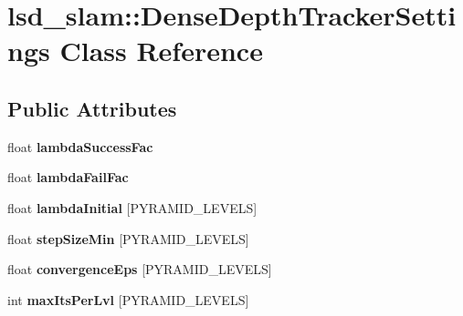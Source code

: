 \hypertarget{classlsd__slam_1_1_dense_depth_tracker_settings}{\section{lsd\-\_\-slam\-:\-:Dense\-Depth\-Tracker\-Settings Class Reference}
\label{classlsd__slam_1_1_dense_depth_tracker_settings}
}
\subsection*{Public Attributes}
\begin{DoxyCompactItemize}
\item 
\hypertarget{classlsd__slam_1_1_dense_depth_tracker_settings_ac964eeef2837d1047245598866f3fd31}{float {\bfseries lambda\-Success\-Fac}}\label{classlsd__slam_1_1_dense_depth_tracker_settings_ac964eeef2837d1047245598866f3fd31}

\item 
\hypertarget{classlsd__slam_1_1_dense_depth_tracker_settings_abc53b178710b351e7ea4f0ccc5bbbf73}{float {\bfseries lambda\-Fail\-Fac}}\label{classlsd__slam_1_1_dense_depth_tracker_settings_abc53b178710b351e7ea4f0ccc5bbbf73}

\item 
\hypertarget{classlsd__slam_1_1_dense_depth_tracker_settings_ac7bf015b9fa449145ef9954326cbe16d}{float {\bfseries lambda\-Initial} \mbox{[}P\-Y\-R\-A\-M\-I\-D\-\_\-\-L\-E\-V\-E\-L\-S\mbox{]}}\label{classlsd__slam_1_1_dense_depth_tracker_settings_ac7bf015b9fa449145ef9954326cbe16d}

\item 
\hypertarget{classlsd__slam_1_1_dense_depth_tracker_settings_ac9bab78963ce2e98312d6710763b3c58}{float {\bfseries step\-Size\-Min} \mbox{[}P\-Y\-R\-A\-M\-I\-D\-\_\-\-L\-E\-V\-E\-L\-S\mbox{]}}\label{classlsd__slam_1_1_dense_depth_tracker_settings_ac9bab78963ce2e98312d6710763b3c58}

\item 
\hypertarget{classlsd__slam_1_1_dense_depth_tracker_settings_a8c5eff9bb7f1a2bb1adfab58ee7f833c}{float {\bfseries convergence\-Eps} \mbox{[}P\-Y\-R\-A\-M\-I\-D\-\_\-\-L\-E\-V\-E\-L\-S\mbox{]}}\label{classlsd__slam_1_1_dense_depth_tracker_settings_a8c5eff9bb7f1a2bb1adfab58ee7f833c}

\item 
\hypertarget{classlsd__slam_1_1_dense_depth_tracker_settings_ae31e5ef0c319ed30a743f628ab7f8eca}{int {\bfseries max\-Its\-Per\-Lvl} \mbox{[}P\-Y\-R\-A\-M\-I\-D\-\_\-\-L\-E\-V\-E\-L\-S\mbox{]}}\label{classlsd__slam_1_1_dense_depth_tracker_settings_ae31e5ef0c319ed30a743f628ab7f8eca}


\end{DoxyCompactItemize}
